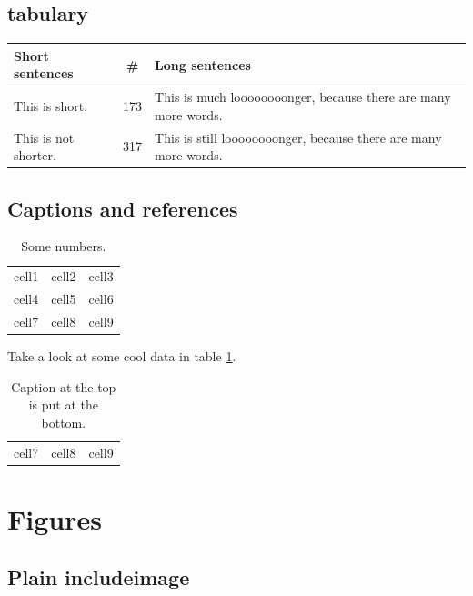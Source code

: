 \documentclass{article}
\begin{document}
  \subsection{tabulary}

  \usepackage{tabulary}

  \begin{center}
    \begin{tabulary}{0.7\textwidth}{LCL}
      Short sentences      & \#  & Long sentences                                                 \\
      \hline
      This is short.       & 173 & This is much loooooooonger, because there are many more words.  \\
      This is not shorter. & 317 & This is still loooooooonger, because there are many more words. \\
    \end{tabulary}
  \end{center}

  \subsection{Captions and references}

  \begin{table}[h]
    \begin{tabular}{ c c c }
       cell1 & cell2 & cell3 \\
       cell4 & cell5 & cell6 \\
       cell7 & cell8 & cell9
    \end{tabular}
    \caption{Some numbers.}
    \label{table:1}
  \end{table}

  Take a look at some cool data in table \ref{table:1}.

  \begin{table}[h]
    \caption{Caption at the top is put at the bottom.}
    \begin{tabular}{ c c c }
       cell7 & cell8 & cell9
    \end{tabular}
  \end{table}

  \section{Figures}

  \subsection{Plain includeimage}
\end{document}
